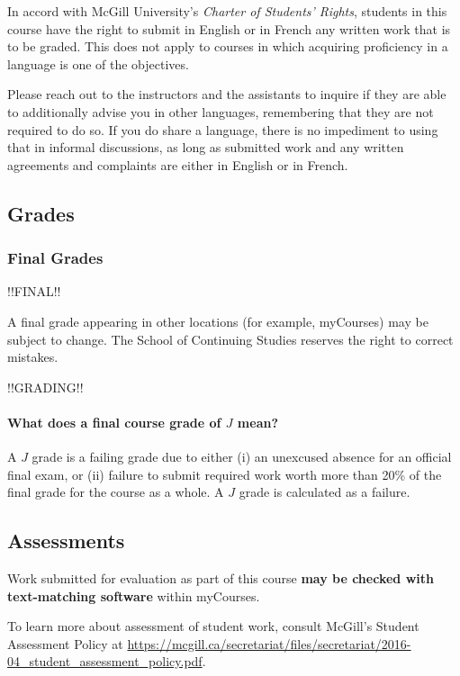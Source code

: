 \documentclass{article}
\begin{document}
In accord with McGill University's {\em Charter of Students' Rights},
students in this course have the right to submit in English or in
French any written work that is to be graded. This does not apply to
courses in which acquiring proficiency in a language is one of the
objectives.

Please reach out to the instructors and the assistants to inquire if
they are able to additionally advise you in other languages,
remembering that they are not required to do so. If you do share a
language, there is no impediment to using that in informal
discussions, as long as submitted work and any written agreements and
complaints are either in English or in French.

\newpage

\subsection{Grades}

\subsubsection{Final Grades}

!!FINAL!!

A final grade appearing in other locations (for example, myCourses)
may be subject to change.  The School of Continuing Studies reserves
the right to correct mistakes.

!!GRADING!!

\paragraph{What does a final course grade of $J$ mean?}

A $J$ grade is a failing grade due to either (i) an unexcused absence
for an official final exam, or (ii) failure to submit required work
worth more than 20\% of the final grade for the course as a whole. A
$J$ grade is calculated as a failure.

\newpage

\subsection{Assessments}

Work submitted for evaluation as part of this course {\bf may be
  checked with text-matching software} within myCourses.

To learn more about assessment of student work, consult McGill's
Student Assessment Policy at
\url{https://mcgill.ca/secretariat/files/secretariat/2016-04_student_assessment_policy.pdf}.
\end{document}
